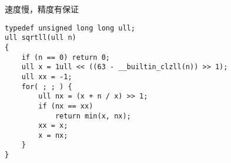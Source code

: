 速度慢，精度有保证
\begin{lstlisting}
typedef unsigned long long ull;
ull sqrtll(ull n)
{
	if (n == 0) return 0;
	ull x = 1ull << ((63 - __builtin_clzll(n)) >> 1);
	ull xx = -1;
	for( ; ; ) {
		ull nx = (x + n / x) >> 1;
		if (nx == xx)
			return min(x, nx);
		xx = x;
		x = nx;
	}
}
\end{lstlisting}
